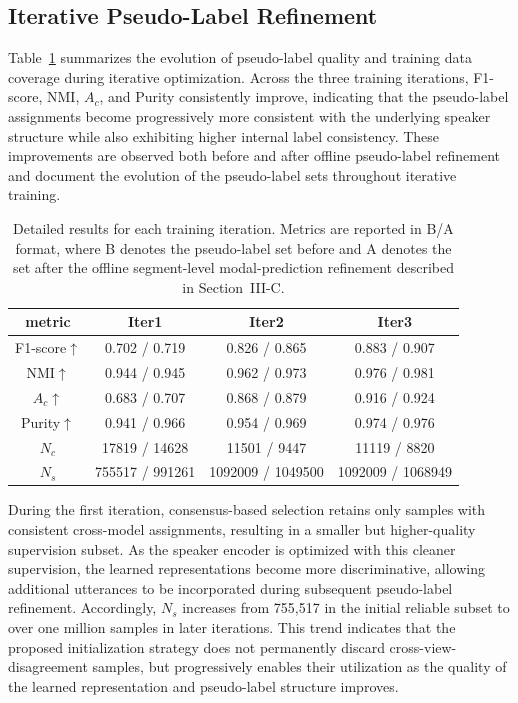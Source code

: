 \documentclass[journal]{IEEEtran}
\begin{document}
\subsection{Iterative Pseudo-Label Refinement}

Table~\ref{tab:iteration} summarizes the evolution of pseudo-label
quality and training data coverage during iterative optimization.
Across the three training iterations, F1-score, NMI, $A_c$, and
Purity consistently improve, indicating that the pseudo-label
assignments become progressively more consistent with the underlying
speaker structure while also exhibiting higher internal label
consistency. These improvements are observed both before and after
offline pseudo-label refinement and document the evolution of the
pseudo-label sets throughout iterative training.
\begin{table}[!t] %
    \centering
    \caption{Detailed results for each training iteration. Metrics are reported in B/A format, where B denotes the pseudo-label set before and A denotes the set after the offline segment-level modal-prediction refinement described in Section~III-C.} %
    \setlength{\tabcolsep}{3.6pt} %
    \begin{tabular}{c c c c} %
        \hline
        metric & Iter1 & Iter2 & Iter3   \\
        \hline
        F1-score$\uparrow$  & 0.702 / 0.719 & 0.826 / 0.865 & 0.883 / 0.907 \\  
        NMI$\uparrow$  & 0.944 / 0.945 & 0.962 / 0.973 & 0.976 / 0.981 \\
        $A_c$$\uparrow$  & 0.683 / 0.707 & 0.868 / 0.879 & 0.916 / 0.924 \\
        Purity$\uparrow$  & 0.941 / 0.966 & 0.954 / 0.969 & 0.974 / 0.976 \\
        $N_c$  & 17819 / 14628 & 11501 / 9447 & 11119 / 8820 \\
        $N_s$  & 755517 / 991261 & 1092009 / 1049500 & 1092009 / 1068949 \\
        \hline
    \end{tabular}
    \label{tab:iteration}
\end{table}
\FloatBarrier




During the first iteration, consensus-based selection retains only
samples with consistent cross-model assignments, resulting in a smaller
but higher-quality supervision subset. As the speaker encoder is
optimized with this cleaner supervision, the learned representations
become more discriminative, allowing additional utterances to be
incorporated during subsequent pseudo-label refinement. Accordingly,
$N_s$ increases from 755,517 in the initial reliable subset to over
one million samples in later iterations. This trend indicates that the
proposed initialization strategy does not permanently discard
cross-view-disagreement samples, but progressively enables their utilization as the
quality of the learned representation and pseudo-label structure
improves.
\end{document}
